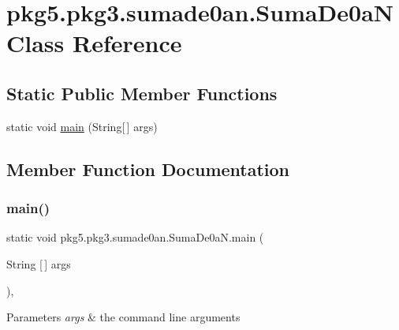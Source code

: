 \hypertarget{classpkg5_1_1pkg3_1_1sumade0an_1_1_suma_de0a_n}{}\section{pkg5.\+pkg3.\+sumade0an.\+Suma\+De0aN Class Reference}
\label{classpkg5_1_1pkg3_1_1sumade0an_1_1_suma_de0a_n}
\subsection*{Static Public Member Functions}
\begin{DoxyCompactItemize}
\item 
static void \mbox{\hyperlink{classpkg5_1_1pkg3_1_1sumade0an_1_1_suma_de0a_n_abf9044d0bbe12ca2da094603dd01d0b0}{main}} (String\mbox{[}$\,$\mbox{]} args)
\end{DoxyCompactItemize}


\subsection{Member Function Documentation}
\mbox{\label{classpkg5_1_1pkg3_1_1sumade0an_1_1_suma_de0a_n_abf9044d0bbe12ca2da094603dd01d0b0}} 
\subsubsection{\texorpdfstring{main()}{main()}}
{\footnotesize\ttfamily static void pkg5.\+pkg3.\+sumade0an.\+Suma\+De0a\+N.\+main (\begin{DoxyParamCaption}\item[{String \mbox{[}$\,$\mbox{]}}]{args }\end{DoxyParamCaption})\hspace{0.3cm}{\ttfamily [inline]}, {\ttfamily [static]}}


\begin{DoxyParams}{Parameters}
{\em args} & the command line arguments \\
\hline
\end{DoxyParams}

